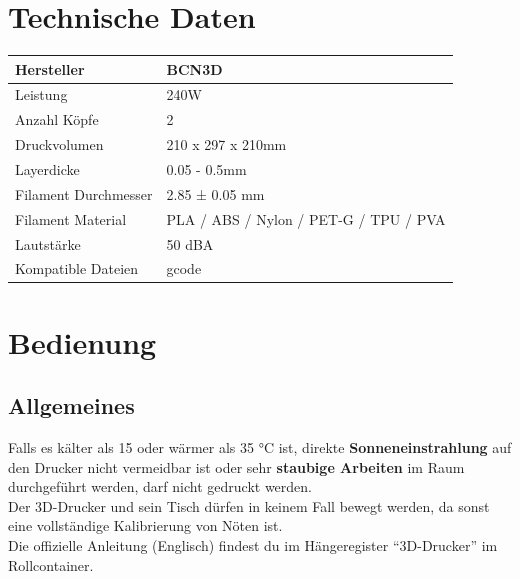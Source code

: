 \documentclass[a4paper]{article}
\begin{document}
\section{Technische Daten}
 \begin{tabular}{|l|l|}
 	\hline
 	Hersteller & BCN3D\\
 	\hline
 	Leistung & 240W \\
 	\hline
 	Anzahl Köpfe & 2 \\
 	\hline
	Druckvolumen &  210 x 297 x 210mm\\
	\hline
	Layerdicke & 0.05 - 0.5mm\\
	\hline
	Filament Durchmesser & 2.85 ± 0.05 mm\\
	\hline
	Filament Material & PLA / ABS / Nylon / PET-G / TPU / PVA\\
	\hline
	Lautstärke & 50 dBA\\
	\hline
	Kompatible Dateien & gcode \\
	\hline
\end{tabular}
\newpage
\section{Bedienung}
\subsection{Allgemeines}
Falls es kälter als 15 oder wärmer als 35 °C ist, direkte \textbf{Sonneneinstrahlung} auf den Drucker nicht vermeidbar ist oder sehr \textbf{staubige Arbeiten} im Raum durchgeführt werden, darf nicht gedruckt werden.\\
Der 3D-Drucker und sein Tisch dürfen in keinem Fall bewegt werden, da sonst eine vollständige Kalibrierung von Nöten ist.\\
Die offizielle Anleitung (Englisch) findest du im Hängeregister "`3D-Drucker"' im Rollcontainer.
\end{document}
